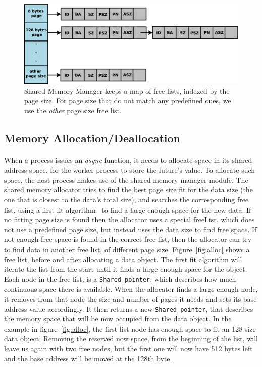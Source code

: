 \begin{figure}[!ht]
\includegraphics[width=\columnwidth]{figures/free_lists}
\caption{Shared Memory Manager keeps a map of free lists, indexed by the page size.  For page size that do
not match any predefined ones, we use the \emph{other} page size free list.}
\label{fig:freeLists}
\end{figure}

\subsection{Memory Allocation/Deallocation}
\paragraph{}
When a process issues an \emph{async} function, it needs to allocate space in its shared address space, for the worker process to store the future's value.  To allocate such space, the host process makes use of the shared memory manager module. 
The shared memory allocator tries to find the best page size
fit for the data size (the one that is closest to the data's total size), and searches the corresponding free list, 
using a first fit algorithm~\cite[p.~185-187]{Tanenbaum:2007:MOS:1410217} to find a large 
enough space for the new data. If no fitting page size is found then the allocator uses a special freeList, 
which does not use a predefined page size, but instead uses the data size to find free space.  If not enough free
space is found in the correct free list, then the allocator can try to find data in another free list, of different
page size.  Figure~\ref{fig:alloc} shows a free list, before and after allocating a data object.
The first fit algorithm 
will iterate the list from the start until it finds a large enough space for the object.  Each node in the free list,
is a \texttt{Shared\_pointer}, which describes how much continuous space there is available.  When the allocator finds a large
enough node, it removes from that node the size and number of pages it needs and sets its base address value 
accordingly.
It then returns a new \texttt{Shared\_pointer}, that describes the memory space that will be now occupied from the data object.
In the example in figure~\ref{fig:alloc}, the first list node has enough space to fit an 128 size data object.  
Removing the reserved now space, from the beginning of the list, will leave us again with two free nodes, but the
first one will now have 512 bytes left and the base address will be moved at the 128th byte.

